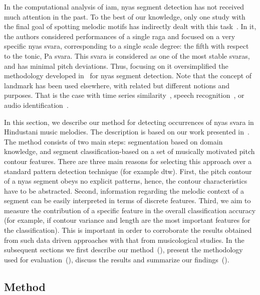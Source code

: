 {In the computational analysis of \gls{iam}, \gls{nyas} segment detection has not received much attention in the past. To the best of our knowledge, only one study with the final goal of spotting melodic motifs has indirectly dealt with this task~\citep{Ross2012}. In it, the authors considered performances of a single \gls{raga} and focused on a very specific \gls{nyas} \gls{svara}, corresponding to a single scale degree: the fifth with respect to the tonic, Pa \gls{svara}. This \gls{svara} is considered as one of the most stable \glspl{svara}, and has minimal pitch deviations. Thus, focusing on it oversimplified the methodology developed in~\cite{Ross2012} for \gls{nyas} segment detection. Note that the concept of landmark has been used elsewhere, with related but different notions and purposes. That is the case with time series similarity~\citep{Perng00ICDE}, speech recognition~\citep{Jansen08JASA,Chen12ICASSP}, or audio identification~\citep{Duong13ICASSP}.

In this section, we describe our method for detecting occurrences of \gls{nyas} \gls{svara} in Hindustani music melodies. The description is based on our work presented in~\cite{gulati2014Landmark}. The method consists of two main steps: segmentation based on domain knowledge, and segment classification-based on a set of musically motivated pitch contour features. There are three main reasons for selecting this approach over a standard pattern detection technique (for example \gls{dtw}). First, the pitch contour of a \gls{nyas} segment obeys no explicit patterns, hence, the contour characteristics have to be abstracted. Second, information regarding the melodic context of a segment can be easily interpreted in terms of discrete features. Third, we aim to measure the contribution of a specific feature in the overall classification accuracy (for example, if contour variance and length are the most important features for the classification). This is important in order to corroborate the results obtained from such data driven approaches with that from musicological studies. In the subsequent sections we first describe our method~(), present the methodology used for evaluation~(), discuss the results and summarize our findings~().

\subsection{Method}
\label{sec:pre_processing_nyas_id_method}

}
